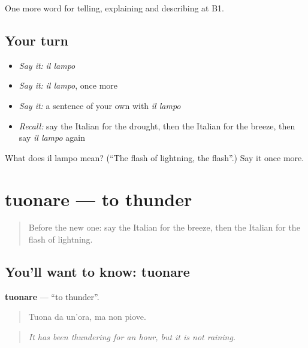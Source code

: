 \begin{grammarlens}[title={What you've built}]
One more word for telling, explaining and describing at B1.
\end{grammarlens}

\subsection*{Your turn}
\begin{itemize}
\raggedright
  \item \emph{Say it:} \emph{il lampo}
  \item \emph{Say it:} \emph{il lampo}, once more
  \item \emph{Say it:} a sentence of your own with \emph{il lampo}
  \item \emph{Recall:} say the Italian for the drought, then the Italian for the breeze, then say \emph{il lampo} again
\end{itemize}

\begin{tcolorbox}[breakable,colback=teal!4,colframe=teal!35!black,title={Before you move on}]
What does il lampo mean? (\textquotedblleft{}The flash of lightning, the flash\textquotedblright{}.) Say it once more.
\end{tcolorbox}
\section[tuonare]{tuonare — to thunder}

\label{lesson:IT-C467-tuonare}



\begin{quote}
Before the new one: say the Italian for the breeze, then the Italian for the flash of lightning.
\end{quote}

\subsection*{You'll want to know: tuonare}
\textbf{tuonare} — \textquotedblleft{}to thunder\textquotedblright{}.

\begin{quote}
Tuona da un'ora, ma non piove.
\end{quote}

\begin{quote}
\emph{It has been thundering for an hour, but it is not raining.}
\end{quote}

